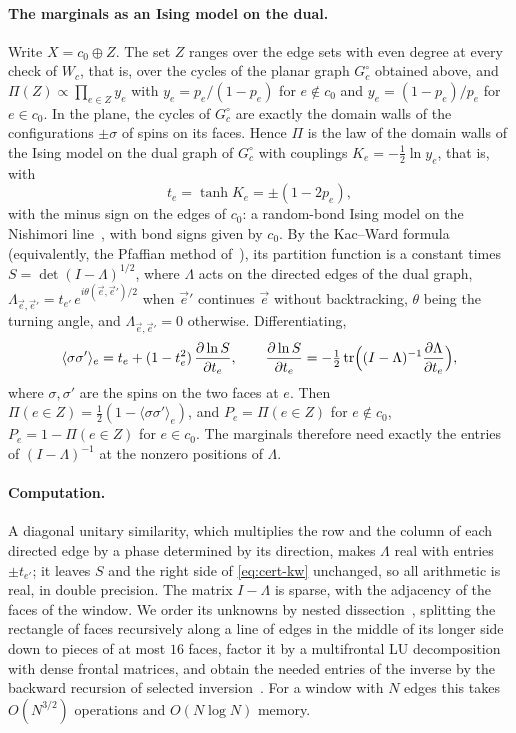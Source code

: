 \documentclass[11pt]{amsart}
\theoremstyle{definition}
\theoremstyle{remark}
\numberwithin{equation}{section}
\begin{document}
\paragraph{The marginals as an Ising model on the dual.} Write $X=c_0\oplus Z$. The set $Z$ ranges over the edge sets with even degree at every check of $W_c$, that is, over the cycles of the planar graph $G_c^{\circ}$ obtained above, and $\Pi(Z)\propto\prod_{e\in Z}y_e$ with $y_e=p_e/(1-p_e)$ for $e\notin c_0$ and $y_e=(1-p_e)/p_e$ for $e\in c_0$. In the plane, the cycles of $G_c^{\circ}$ are exactly the domain walls of the configurations $\pm\sigma$ of spins on its faces. Hence $\Pi$ is the law of the domain walls of the Ising model on the dual graph of $G_c^{\circ}$ with couplings $K_e=-\tfrac12\ln y_e$, that is, with
\[
t_e=\tanh K_e=\pm(1-2p_e),
\]
with the minus sign on the edges of $c_0$: a random-bond Ising model on the Nishimori line~\cite{Nis81}, with bond signs given by $c_0$. By the Kac--Ward formula~\cite{KW52} (equivalently, the Pfaffian method of~\cite{Kas61,Fis61}), its partition function is a constant times $S=\det(I-\Lambda)^{1/2}$, where $\Lambda$ acts on the directed edges of the dual graph, $\Lambda_{\vec e,\vec e'}=t_{e'}\,e^{i\theta(\vec e,\vec e')/2}$ when $\vec e'$ continues $\vec e$ without backtracking, $\theta$ being the turning angle, and $\Lambda_{\vec e,\vec e'}=0$ otherwise. Differentiating,
\begin{equation}\label{eq:cert-kw}
\langle\sigma\sigma'\rangle_e=t_e+(1-t_e^2)\,\frac{\partial\ln S}{\partial t_e},\qquad
\frac{\partial\ln S}{\partial t_e}=-\tfrac12\operatorname{tr}\Bigl((I-\Lambda)^{-1}\frac{\partial\Lambda}{\partial t_e}\Bigr),
\end{equation}
where $\sigma,\sigma'$ are the spins on the two faces at $e$. Then $\Pi(e\in Z)=\tfrac12(1-\langle\sigma\sigma'\rangle_e)$, and $P_e=\Pi(e\in Z)$ for $e\notin c_0$, $P_e=1-\Pi(e\in Z)$ for $e\in c_0$. The marginals therefore need exactly the entries of $(I-\Lambda)^{-1}$ at the nonzero positions of $\Lambda$.

\paragraph{Computation.} A diagonal unitary similarity, which multiplies the row and the column of each directed edge by a phase determined by its direction, makes $\Lambda$ real with entries $\pm t_{e'}$; it leaves $S$ and the right side of \eqref{eq:cert-kw} unchanged, so all arithmetic is real, in double precision. The matrix $I-\Lambda$ is sparse, with the adjacency of the faces of the window. We order its unknowns by nested dissection~\cite{Geo73}, splitting the rectangle of faces recursively along a line of edges in the middle of its longer side down to pieces of at most $16$ faces, factor it by a multifrontal LU decomposition with dense frontal matrices, and obtain the needed entries of the inverse by the backward recursion of selected inversion~\cite{LLYCE09,LYMLYE11}. For a window with $N$ edges this takes $O(N^{3/2})$ operations and $O(N\log N)$ memory.
\end{document}
